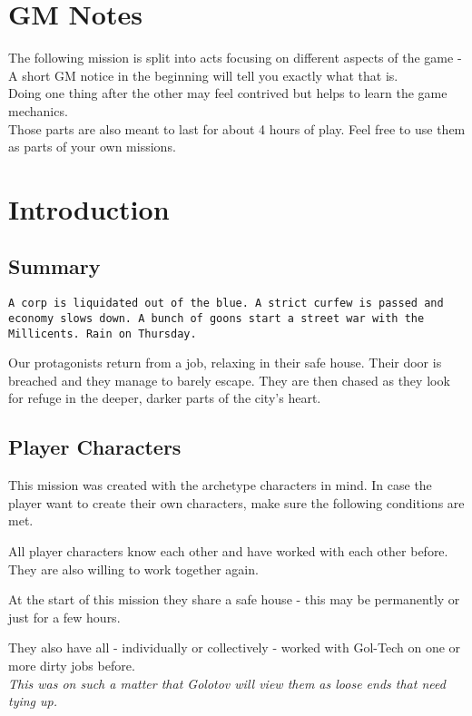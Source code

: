 \documentclass[12pt,a4paper,openany]{book}
\begin{document}
	
	
	\chapter{GM Notes}
		The following mission is split into acts focusing on different aspects of the game -
		A short GM notice in the beginning will tell you exactly what that is.
		\\
		Doing one thing after the other may feel contrived but helps to learn the game mechanics.
		\\
		Those parts are also meant to last for about 4 hours of play. Feel free to use them as parts of your own missions.
	
	\chapter{Introduction}
	\section{Summary}
		\texttt{A corp is liquidated out of the blue. A strict curfew is passed and economy slows down. A bunch of goons start a street war with the Millicents. Rain on Thursday.}
		\par
		Our protagonists return from a job, relaxing in their safe house. Their door is breached and they manage to barely escape. They are then chased as they look for refuge in the deeper, darker parts of the city's heart.
		\par
		
	\section{Player Characters}
		This mission was created with the archetype characters in mind.
		In case the player want to create their own characters, make sure the following conditions are met.
		\par
		All player characters know each other and have worked with each other before. They are also willing to work together again.
		\par
		At the start of this mission they share a safe house - this may be permanently or just for a few hours.
		\par
		They also have all - individually or collectively - worked with Gol-Tech on one or more dirty jobs before. \\
		\emph{This was on such a matter that Golotov will view them as loose ends that need tying up.}
	
\end{document}
